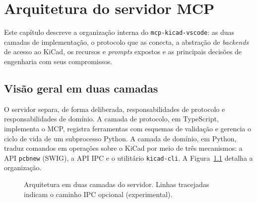 \chapter{Arquitetura do servidor MCP}\label{cap:arquitetura}

Este capítulo descreve a organização interna do \texttt{mcp-kicad-vscode}: as
duas camadas de implementação, o protocolo que as conecta, a abstração de
\emph{backends} de acesso ao KiCad, os recursos e \emph{prompts} expostos e as
principais decisões de engenharia com seus compromissos.

\section{Visão geral em duas camadas}

O servidor separa, de forma deliberada, responsabilidades de protocolo e
responsabilidades de domínio. A camada de protocolo, em TypeScript, implementa
o MCP, registra ferramentas com esquemas de validação e gerencia o ciclo de
vida de um subprocesso Python. A camada de domínio, em Python, traduz comandos
em operações sobre o KiCad por meio de três mecanismos: a API \texttt{pcbnew}
(SWIG), a API IPC e o utilitário \texttt{kicad-cli}. A
Figura~\ref{fig:arquitetura-mono} detalha a organização.

\begin{figure}[htbp]
\centering
{}
\caption{Arquitetura em duas camadas do servidor. Linhas tracejadas indicam o
caminho IPC opcional (experimental).}
\label{fig:arquitetura-mono}
\end{figure}

